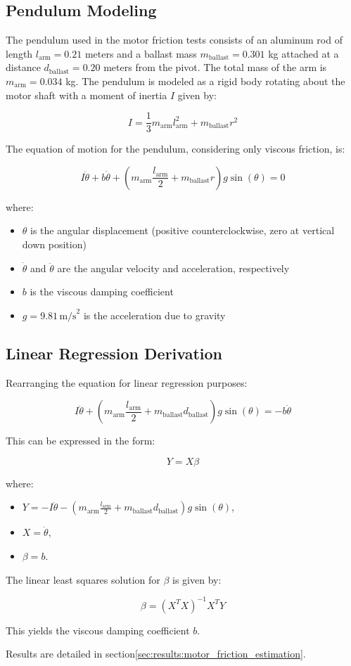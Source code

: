 \subsection{Pendulum Modeling}
The pendulum used in the motor friction tests consists of an aluminum rod of length \( l_{\text{arm}} = 0.21 \) meters and a ballast mass \( m_{\text{ballast}} = 0.301 \) kg attached at a distance \( d_{\text{ballast}} = 0.20 \) meters from the pivot. The total mass of the arm is \( m_{\text{arm}} = 0.034 \) kg. The pendulum is modeled as a rigid body rotating about the motor shaft with a moment of inertia \( I \) given by:



\[
I = \frac{1}{3} m_{\text{arm}} l_{\text{arm}}^2 + m_{\text{ballast}} r^2
\]

The equation of motion for the pendulum, considering only viscous friction, is:

\[
I \ddot{\theta} + b \dot{\theta} + (m_{\text{arm}} \frac{l_{\text{arm}}}{2} + m_{\text{ballast}} r) g \sin(\theta) = 0
\]

where:
\begin{itemize}
    \item \( \theta \) is the angular displacement (positive counterclockwise, zero at vertical down position)
    \item \( \dot{\theta} \) and \( \ddot{\theta} \) are the angular velocity and acceleration, respectively
    \item \( b \) is the viscous damping coefficient
    \item \( g = 9.81 \, \text{m/s}^2 \) is the acceleration due to gravity
\end{itemize}

\subsection{Linear Regression Derivation}
Rearranging the equation for linear regression purposes:

\[
    I \ddot{\theta} + (m_{\text{arm}} \frac{l_{\text{arm}}}{2} + m_{\text{ballast}} d_{\text{ballast}}) g \sin(\theta) = -b \dot{\theta}
\]

This can be expressed in the form:

\[
Y = X \beta
\]

where:
\begin{itemize}
    \item \( Y = -I \ddot{\theta} - (m_{\text{arm}} \frac{l_{\text{arm}}}{2} + m_{\text{ballast}} d_{\text{ballast}}) g \sin(\theta) \),
    \item \( X = \dot{\theta} \),
    \item \( \beta = b \).
\end{itemize}

The linear least squares solution for \( \beta \) is given by:

\[
\beta = (X^T X)^{-1} X^T Y
\]

This yields the viscous damping coefficient \( b \).

Results are detailed in section\ref{sec:results:motor_friction_estimation}.